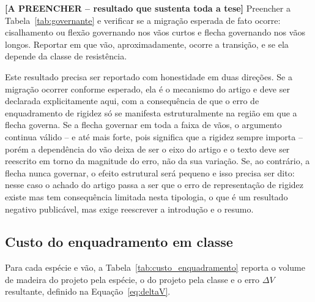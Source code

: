 \begin{fillblock}
\noindent\textbf{[A PREENCHER -- resultado que sustenta toda a tese]} Preencher a Tabela~\ref{tab:governante} e verificar se a migração esperada de fato ocorre: cisalhamento ou flexão governando nos vãos curtos e flecha governando nos vãos longos. Reportar em que vão, aproximadamente, ocorre a transição, e se ela depende da classe de resistência.

Este resultado precisa ser reportado com honestidade em duas direções. Se a migração ocorrer conforme esperado, ela é o mecanismo do artigo e deve ser declarada explicitamente aqui, com a consequência de que o erro de enquadramento de rigidez só se manifesta estruturalmente na região em que a flecha governa. Se a flecha governar em toda a faixa de vãos, o argumento continua válido -- e até mais forte, pois significa que a rigidez sempre importa -- porém a dependência do vão deixa de ser o eixo do artigo e o texto deve ser reescrito em torno da magnitude do erro, não da sua variação. Se, ao contrário, a flecha nunca governar, o efeito estrutural será pequeno e isso precisa ser dito: nesse caso o achado do artigo passa a ser que o erro de representação de rigidez existe mas tem consequência limitada nesta tipologia, o que é um resultado negativo publicável, mas exige reescrever a introdução e o resumo.
\end{fillblock}

\subsection{Custo do enquadramento em classe}\label{sec:custo_enquadramento}

Para cada espécie e vão, a Tabela~\ref{tab:custo_enquadramento} reporta o volume de madeira do projeto pela espécie, o do projeto pela classe e o erro $\Delta V$ resultante, definido na Equação~\eqref{eq:deltaV}.

